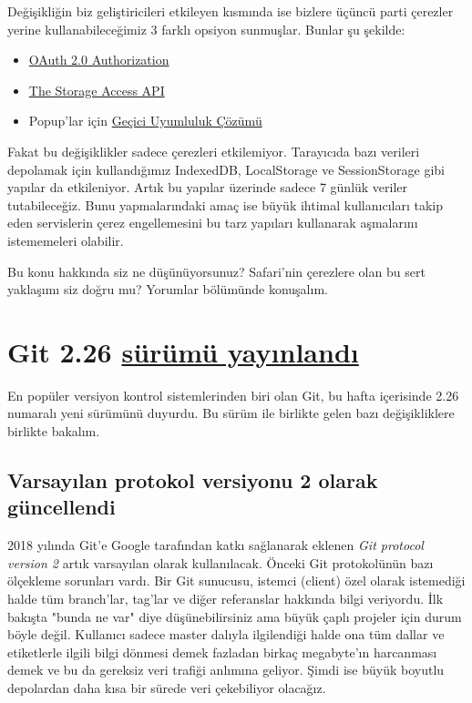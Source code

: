 \documentclass[11pt]{article}
\begin{document}
Değişikliğin biz geliştiricileri etkileyen kısmında ise bizlere üçüncü parti
çerezler yerine kullanabileceğimiz 3 farklı opsiyon sunmuşlar. Bunlar şu
şekilde:

\begin{itemize}
\item \href{https://tools.ietf.org/html/rfc6749}{OAuth 2.0 Authorization}
\item \href{https://webkit.org/blog/8124/introducing-storage-access-api/}{The Storage Access API}
\item Popup'lar için \href{https://webkit.org/blog/8311/intelligent-tracking-prevention-2-0/}{Geçici Uyumluluk Çözümü}
\end{itemize}

Fakat bu değişiklikler sadece çerezleri etkilemiyor. Tarayıcıda bazı verileri
depolamak için kullandığımız IndexedDB, LocalStorage ve SessionStorage gibi
yapılar da etkileniyor. Artık bu yapılar üzerinde sadece 7 günlük veriler
tutabileceğiz. Bunu yapmalarındaki amaç ise büyük ihtimal kullanıcıları takip
eden servislerin çerez engellemesini bu tarz yapıları kullanarak aşmalarını
istememeleri olabilir.

Bu konu hakkında siz ne düşünüyorsunuz? Safari'nin çerezlere olan bu sert
yaklaşımı siz doğru mu? Yorumlar bölümünde konuşalım.
\section{Git 2.26 \href{https://lore.kernel.org/git/xmqqa7477u6j.fsf@gitster.c.googlers.com/T/\#u}{sürümü yayınlandı}}
\label{sec:org3dcbe6b}
En popüler versiyon kontrol sistemlerinden biri olan Git, bu hafta içerisinde
2.26 numaralı yeni sürümünü duyurdu. Bu sürüm ile birlikte gelen bazı
değişikliklere birlikte bakalım.

\subsection{Varsayılan protokol versiyonu 2 olarak güncellendi}
\label{sec:org5510638}
2018 yılında Git'e Google tarafından katkı sağlanarak eklenen \emph{Git protocol
version 2} artık varsayılan olarak kullanılacak. Önceki Git protokolünün bazı
ölçekleme sorunları vardı. Bir Git sunucusu, istemci (client) özel olarak
istemediği halde tüm branch'lar, tag'lar ve diğer referanslar hakkında bilgi
veriyordu. İlk bakışta "bunda ne var" diye düşünebilirsiniz ama büyük çaplı
projeler için durum böyle değil. Kullanıcı sadece master dalıyla ilgilendiği
halde ona tüm dallar ve etiketlerle ilgili bilgi dönmesi demek fazladan
birkaç megabyte'ın harcanması demek ve bu da gereksiz veri trafiği anlımına
geliyor. Şimdi ise büyük boyutlu depolardan daha kısa bir sürede veri
çekebiliyor olacağız.
\end{document}
